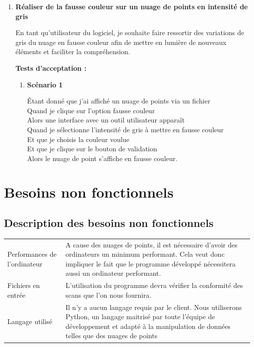 \documentclass[12pt,titlepage,french]{article}
\begin{document}
\begin{enumerate}
\begin{enumerate}
\end{enumerate}
\item \textbf{Réaliser de la fausse couleur sur un nuage de points en intensité de gris}

En tant qu'utilisateur du logiciel, je souhaite faire ressortir des variations de gris du nuage en fausse couleur afin de mettre en lumière de nouveaux éléments et faciliter la compréhension.

\textbf{Tests d'acceptation :}

\begin{enumerate}
    \item \textbf{Scénario 1}
    
Étant donné que j'ai affiché un nuage de points via un fichier\\
Quand je clique sur l'option fausse couleur\\
Alors une interface avec un outil utilisateur apparaît\\
Quand je sélectionne l'intensité de gris à mettre en fausse couleur\\
Et que je choisis la couleur voulue\\
Et que je clique sur le bouton de validation\\
Alors le nuage de point s'affiche en fausse couleur.
\end{enumerate}
\end{enumerate}


\section{Besoins non fonctionnels}

\subsection*{Description des besoins non fonctionnels}

\noindent\begin{tabu} to \textwidth {X[c]X[c3]}\toprule
{}&\\\toprule
Performances de l'ordinateur
& A cause des nuages de points, il est nécessaire d'avoir des ordinateurs un minimum performant. Cela veut donc impliquer le fait que le programme développé nécessitera aussi un ordinateur performant.\\\midrule
Fichiers en entrée
& L'utilisation du programme devra vérifier la conformité des scans que l'on nous fournira.\\\midrule
Langage utilisé
& Il n'y a aucun langage requis par le client. Nous utiliserons Python, un langage maitrisé par toute l'équipe de développement et adapté à la manipulation de données telles que des nuages de points\\\bottomrule
\end{tabu}
\end{document}
